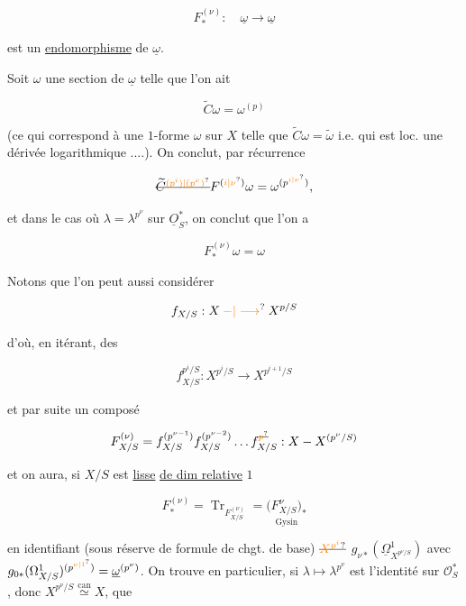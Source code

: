 \[
F_*^{(\nu)}:\quad\underline\omega\longrightarrow\underline\omega
\]

est un \uline{endomorphisme}  de $\underline\omega$.

Soit $\omega$ une section de $\underline\omega$ telle que l'on ait

\[
\widetilde C\omega=\omega^{(p)}
\]

(ce qui correspond à une  $1$-forme $\omega$ sur $X$ telle que $\widetilde C\omega=\widetilde\omega$ i.e. qui est loc. une dérivée logarithmique ....). On conclut, par récurrence

\[
\deleted{\widetilde C^{\unsure{(p^i)|(p^\nu)}}}F^{(\unsure{i|\nu})}\omega=\omega^{(p^{\unsure{i|\nu}})},
\]

et dans le cas où $\lambda=\lambda^{p^\nu}$ sur $\underline O_S^{*}$, on conclut que l'on a

\[
\boxed{F_*^{(\nu)}\omega=\omega}
\]




Notons que l'on peut aussi considérer

\[
f_{X/S}:X\mathbin{\unsure{-|\longrightarrow}}X^{p/S}
\]

d'où, en itérant, des

\[
f_{X/S}^{p^i/S}:X^{p^i/S}\longrightarrow X^{p^{i+1}/S}
\]

et par suite un composé

\[
F_{X/S}^{(\nu)}=f_{X/S}^{(p^{\nu-1})}f_{X/S}^{(p^{\nu-2})}\ldots f_{X/S}^{\deleted{\unsure{p}}}:
X\mathbin{-}X^{(p^\nu/S)}
\]

et on aura, si $X/S$ est \uline{lisse} \uline{de dim relative} $1$

\[
F_*^{(\nu)}=\operatorname{Tr}_{F_{X/S}^{(\nu)}}=\underset{\text{Gysin}}{\bigl(F_{X/S}^{\nu}\bigr)_*}
\]

en identifiant (sous réserve de formule de chgt. de base) $\deleted{\unsure{X^{p^i}}}$ $g_{\nu*}(\underline\Omega^1_{X^{p^\nu/S}})$ avec $g_{0*}(\Omega^1_{X/S})^{(p^{\unsure{\nu|1}})}=\underline\omega^{(p^\nu)}$. On trouve en particulier, si $\lambda\longmapsto\lambda^{p^\nu}$ est l'identité sur $\mathcal O_S^{*}$, donc $X^{p^\nu/S}\overset{\mathrm{can}}{\simeq}X$, que

